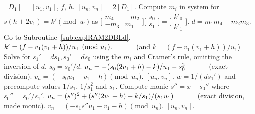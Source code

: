 \begin{algorithm}[htbp]
\caption{Genus 2 Ramified Model Degree 2 Doubling\label{alg:explRAM2DBL}}
\begin{algorithmic}[1]
\Require $[D_1] = [u_1,v_1]$, $f$, $h$.  \smallskip
\Ensure $[u_n,v_n] = 2[D_1]$.
\algrule
\State Compute $m_i$ in system for $s(h + 2v_1) = k' \pmod{u_1}$ as $ \bigl[
\begin{smallmatrix} m_4 & -m_2\\ -m_3 & m_1\end{smallmatrix}\bigr] \bigl[
\begin{smallmatrix} s_0\\ s_1 \end{smallmatrix} \bigr ] = \bigl[ \begin{smallmatrix}k'_0
\\  k'_1\end{smallmatrix} \bigr ]$.
\State $d = m_1m_4 - m_2m_3$.
 Go to Subroutine~\ref{sub:explRAM2DBLd}.
\EndIf
\State $k' = (f - v_1(v_1 + h))/u_1 \pmod{u_1}. \quad\quad\quad$ (and $k = (f - v_1(v_1 + h))/u_1$)
\State Solve for $s_1' = ds_1, s_0' = ds_0$ using the $m_i$ and Cramer's rule, omitting the inversion of $d$.
    \State $s_0 = s_0'/d$.
    \State $u_n = -(s_0(2v_1 + h) - k)/u_1 - s_0^2 \quad\quad\quad $ (exact division).
    \State $v_n = (-s_0u_1 - v_1 - h) \pmod{u_n}$.
    \State \Return $[u_n,v_n]$.
    \EndIf
\State $w = 1/(ds_1')$ and precompute values $1/s_1$, $1/s_1^2$ and $s_1$. 
\State Compute monic $s'' = x + s_0''$ where $s_0'' = s_0'/s_1'$.
\State $u_n = (s'')^2 + (s''(2v_1 + h) - k/s_1)/(s_1u_1) \quad\quad\quad $ (exact division, made monic).
\State $v_n = (-s_1s''u_1 - v_1 - h) \pmod{u_n}$.
\State \Return $[u_n,v_n]$.
\end{algorithmic}
\end{algorithm}


